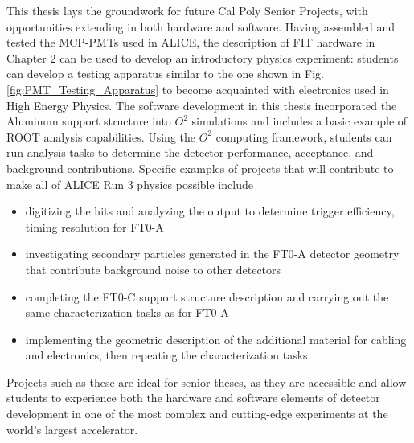 This thesis lays the groundwork for future Cal Poly Senior Projects, with opportunities extending in both hardware and software. Having assembled and tested the MCP-PMTs used in ALICE, the description of FIT hardware in Chapter 2 can be used to develop an introductory physics experiment: students can develop a testing apparatus similar to the one shown in Fig. \ref{fig:PMT_Testing_Apparatus} to become acquainted with electronics used in High Energy Physics. The software development in this thesis incorporated the Aluminum support structure into $O^2$ simulations and includes a basic example of ROOT analysis capabilities. Using the $O^2$ computing framework, students can run analysis tasks to determine the detector performance, acceptance, and background contributions. Specific examples of projects that will contribute to make all of ALICE Run 3 physics possible include 

\begin{itemize}
    \item digitizing the hits and analyzing the output to determine trigger efficiency, timing resolution for FT0-A
    \item investigating secondary particles generated in the FT0-A detector geometry that contribute background noise to other detectors
    \item completing the FT0-C support structure description and carrying out the same characterization tasks as for FT0-A
    \item implementing the geometric description of the additional material for cabling and electronics, then repeating the characterization tasks
\end{itemize}

Projects such as these are ideal for senior theses, as they are accessible and allow students to experience both the hardware and software elements of detector development in one of the most complex and cutting-edge experiments at the world's largest accelerator.